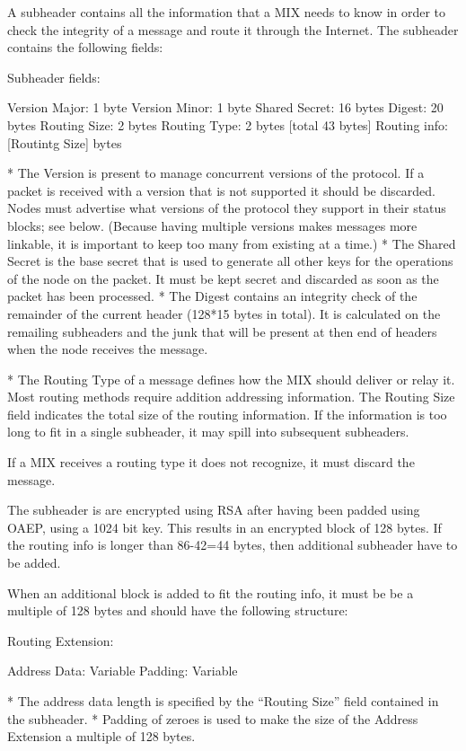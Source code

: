 A subheader contains all the information that a MIX needs to know
in order to check the integrity of a message and route it through the
Internet. The subheader contains the following fields: 

Subheader fields:

Version Major:   1 byte
Version Minor:   1 byte
Shared Secret:   16 bytes
Digest:          20 bytes
Routing Size:    2 bytes
Routing Type:    2 bytes  [total 43 bytes]
Routing info:    [Routintg Size] bytes

* The Version is present to manage concurrent versions of the
protocol. If a packet is received with a version that is not supported
it should be discarded. Nodes must advertise what versions of the
protocol they support in their status blocks; see below.
(Because having multiple versions makes messages more linkable, it is
important to keep too many from existing at a time.)
* The Shared Secret is the base secret that is used to generate all
other keys for the operations of the node on the packet. It must be
kept secret and discarded as soon as the packet has been processed. 
* The Digest contains an integrity check of the remainder of the
current header (128*15 bytes in total).  It is calculated on the
remailing subheaders and the junk that will be present at then end 
of headers when the node receives the message. 

* The Routing Type of a message defines how the MIX should deliver or
  relay it.  Most routing methods require addition addressing information.
  The Routing Size field indicates the total size of the routing
  information.   If the information is too long to fit in a single
  subheader, it may spill into subsequent subheaders.

  If a MIX receives a routing type it does not recognize, it must
  discard the message. 

  The subheader is are encrypted using RSA after having been padded
  using OAEP, using a 1024 bit key.  This results in an encrypted block
  of 128 bytes.  If the routing info is longer than 86-42=44 bytes, then
  additional subheader have to be added.

  When an additional block is added to fit the routing info, it must be be a
  multiple of 128 bytes and should have the following structure:
 
  Routing Extension:

    Address Data:     Variable
    Padding:          Variable

* The address data length is specified by the ``Routing Size'' field
  contained in the subheader.
* Padding of zeroes is used to make the size of the Address Extension a
multiple of 128 bytes.  

